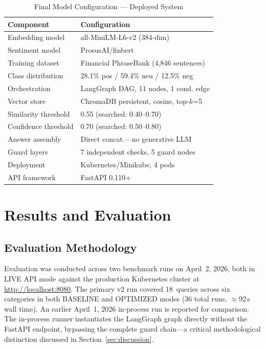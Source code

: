 \documentclass[10pt,twocolumn]{article}
\begin{document}
\begin{table}[htbp]
\caption{Final Model Configuration --- Deployed System}
\label{tab:config}
\centering
\small
\begin{tabular}{@{}ll@{}}
\toprule
\textbf{Component} & \textbf{Configuration} \\
\midrule
Embedding model      & all-MiniLM-L6-v2 (384-dim) \\
Sentiment model      & ProsusAI/finbert \\
Training dataset     & Financial PhraseBank (4,846 sentences) \\
Class distribution   & 28.1\% pos / 59.4\% neu / 12.5\% neg \\
Orchestration        & LangGraph DAG, 11 nodes, 1 cond. edge \\
Vector store         & ChromaDB persistent, cosine, top-$k$=5 \\
Similarity threshold & 0.55 (searched: 0.40--0.70) \\
Confidence threshold & 0.70 (searched: 0.50--0.80) \\
Answer assembly      & Direct concat.---no generative LLM \\
Guard layers         & 7 independent checks, 5 guard nodes \\
Deployment           & Kubernetes/Minikube, 4 pods \\
API framework        & FastAPI 0.110+ \\
\bottomrule
\end{tabular}
\end{table}

\section{Results and Evaluation}
\label{sec:results}

\subsection{Evaluation Methodology}

Evaluation was conducted across two benchmark runs on April~2, 2026,
both in LIVE API mode against the production Kubernetes cluster at
\url{http://localhost:8080}.
The primary v2 run covered 18~queries across six categories in both
BASELINE and OPTIMIZED modes (36 total runs, $\approx$92\,s wall
time).
An earlier April~1, 2026 in-process run is reported for comparison.
The in-process runner instantiates the LangGraph graph directly without
the FastAPI endpoint, bypassing the complete guard chain---a critical
methodological distinction discussed in Section~\ref{sec:discussion}.
\end{document}
